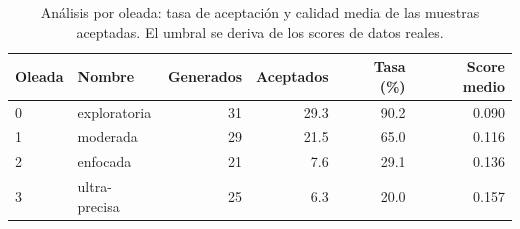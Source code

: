 \begin{table}[htbp]
\centering
\small
\caption{An\'alisis por oleada: tasa de aceptaci\'on y calidad media de las muestras aceptadas. El umbral se deriva de los scores de datos reales.}
\label{tab:progressive_waves_per_wave}
\begin{tabular}{llrrrr}
\toprule
\textbf{Oleada} & \textbf{Nombre} & \textbf{Generados} & \textbf{Aceptados} & \textbf{Tasa (\%)} & \textbf{Score medio} \\
\midrule
0 & exploratoria & 31 & 29.3 & 90.2 & 0.090 \\
1 & moderada & 29 & 21.5 & 65.0 & 0.116 \\
2 & enfocada & 21 & 7.6 & 29.1 & 0.136 \\
3 & ultra-precisa & 25 & 6.3 & 20.0 & 0.157 \\
\bottomrule
\end{tabular}
\end{table}
